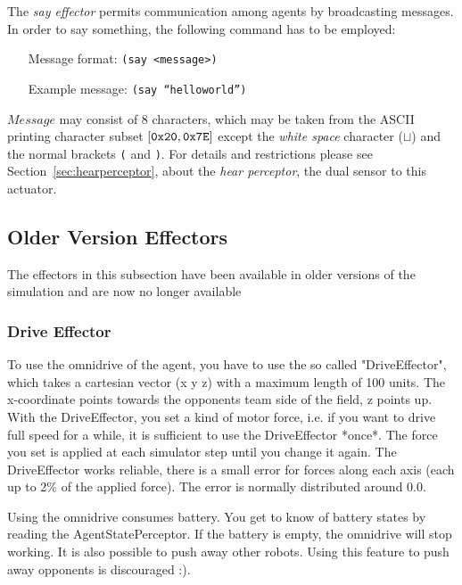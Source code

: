 The \emph{say effector} permits communication among agents by broadcasting
messages. In order to say something, the following command has to be employed:
\begin{itemize}
	\item[Message format:] \texttt{(say <message>)}
	\item[Example message:] \texttt{(say ``helloworld'')}
\end{itemize}
$Message$ may consist of 8 characters, which may be taken from the ASCII 
printing character subset $[{\tt 0x20}, {\tt 0x7E]}$ except the {\it white
space}  character ($\sqcup$) and the normal brackets {\tt(} and {\tt )}. 
For details and restrictions please see Section~\ref{sec:hearperceptor}, about
the \emph{hear perceptor}, the dual sensor to this actuator.

\subsection{Older Version Effectors}
\label{sec:olderversioneffectors}

The effectors in this subsection have been available in older versions of the
simulation and are now no longer available

\subsubsection{Drive Effector}
\label{sec:driveeffector}

To use the omnidrive of the agent, you have to use the so called
"DriveEffector", which takes a cartesian vector (x y z) with a maximum
length of 100 units. The x-coordinate points towards the opponents
team side of the field, z points up. With the DriveEffector, you set a
kind of motor force, i.e. if you want to drive full speed for a while,
it is sufficient to use the DriveEffector *once*. The force you set is
applied at each simulator step until you change it again. The
DriveEffector works reliable, there is a small error for forces along
each axis (each up to 2\% of the applied force). The error is normally
distributed around 0.0.

Using the omnidrive consumes battery. You get to know of battery
states by reading the AgentStatePerceptor. If the battery is empty,
the omnidrive will stop working. It is also possible to push away
other robots. Using this feature to push away opponents is discouraged
:).

